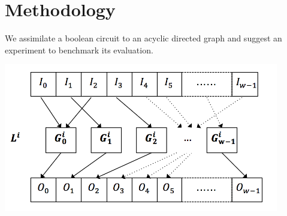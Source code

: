 \section{Methodology}
We assimilate a boolean circuit to an acyclic directed graph and suggest an experiment to benchmark its evaluation.

\includegraphics[width=0.9\textwidth]{img/level.png}


